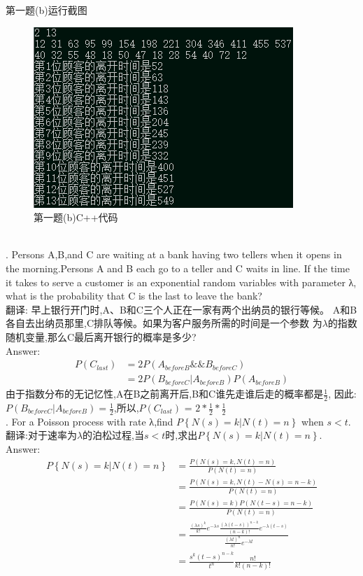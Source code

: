 \documentclass{book}
\begin{document}
第一题(b)运行截图
\begin{figure}[H]
    \centering
    \includegraphics*[]{gramFile/2(d)--1(b).png}
    \caption{第一题(b)C++代码}
\end{figure}

\hspace*{\fill} \\

. Persons A,B,and C are waiting at a bank having two tellers
when it opens in the morning.Persons A and B each go to a teller
and C waits in line. If the time it takes to serve a customer
is an exponential random variables with parameter λ, what is
the probability that C is the last to leave the bank? \\
\noindent
翻译:
早上银行开门时,A、B和C三个人正在一家有两个出纳员的银行等候。
A和B各自去出纳员那里,C排队等候。如果为客户服务所需的时间是一个参数
为$\lambda$的指数随机变量,那么C最后离开银行的概率是多少? \\
\noindent
Answer:
\begin{align*}
    P(C_{last})
     & = 2P(A_{before B} \&\& B_{before C})           \\
     & = 2P(B_{before C}|A_{before B})P(A_{before B})
\end{align*}
\noindent
由于指数分布的无记忆性,A在B之前离开后,B和C谁先走谁后走的概率都是$\frac{1}{2}$,
因此:$P(B_{before C}|A_{before B}) = \frac{1}{2}$,所以,$P(C_{last})$ =
$2*\frac{1}{2}*\frac{1}{2}$ \\

. For a Poisson process with rate λ,find $P\left\{N(s) = k|
    N(t) = n\right\}$ when $s < t$.\\
\noindent
翻译:对于速率为$\lambda$的泊松过程,当$s < t$时,求出$P\left\{N(s)
    =k|N(t)=n\right\}$.\\
\noindent
Answer:
\begin{align*}
    P\left\{N(s)=k|N(t)=n\right\}
     & = \frac{P(N(s)=k,N(t)=n)}{P(N(t)=n)}                 \\
     & = \frac{P(N(s)=k,N(t)-N(s)=n-k)}{P(N(t)=n)}          \\
     & = \frac{P(N(s)=k)P(N(t-s)=n-k)}{P(N(t)=n)}           \\
     & = \frac{\frac{(\lambda s)^{k}}{k!} e^{-\lambda
                s} \frac{(\lambda (t-s))^{n-k}}{(n-k)!} e^{-\lambda
    (t-s)}}{\frac{(\lambda t)^{n}}{n!} e^{-\lambda t}}      \\
     & = \frac{s^{k}(t-s)^{n-k}}{t^{n}} \frac{n!}{k!(n-k)!}
\end{align*}
\end{document}
